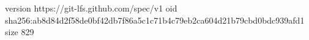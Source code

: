 version https://git-lfs.github.com/spec/v1
oid sha256:ab8d84d2f58de0bf42db7f86a5c1c71b4c79eb2ca604d21b79cbd0bdc939afd1
size 829
